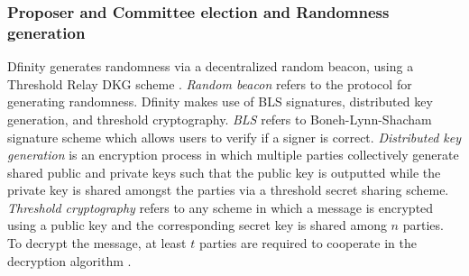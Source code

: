 \documentclass[10pt,journal,compsoc]{IEEEtran}
\begin{document}
\subsubsection{Proposer and Committee election and Randomness generation}
Dfinity generates randomness via a decentralized random beacon, using a Threshold Relay DKG scheme \cite{JF-DKG}. \emph{Random beacon} refers to the protocol for generating randomness. Dfinity makes use of BLS signatures, distributed key generation, and threshold cryptography. \emph{BLS} refers to Boneh-Lynn-Shacham signature scheme which allows users to verify if a signer is correct\cite{BonehEtAl}. \emph{Distributed key generation} is an encryption process in which multiple parties collectively generate shared public and private keys such that the public key is outputted while the private key is shared amongst the parties via a threshold secret sharing scheme\cite{Mahnush}. \emph{Threshold cryptography} refers to any scheme in which a message is encrypted using a public key and the corresponding secret key is shared among $n$ parties. To decrypt the message, at least $t$ parties are required to cooperate in the decryption algorithm \cite{Mahnush}.
\end{document}
